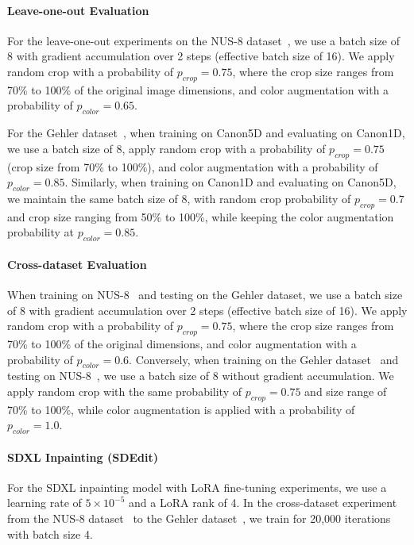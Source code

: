 \paragraph{Leave-one-out Evaluation}
For the leave-one-out experiments on the NUS-8 dataset~\cite{cheng2014illuminant}, we use a batch size of 8 with gradient accumulation over 2 steps (effective batch size of 16). We apply random crop with a probability of $p_{crop} = 0.75$, where the crop size ranges from 70\% to 100\% of the original image dimensions, and color augmentation with a probability of $p_{color} = 0.65$. 

For the Gehler dataset~\cite{4587765}, when training on Canon5D and evaluating on Canon1D, we use a batch size of 8, apply random crop with a probability of $p_{crop} = 0.75$ (crop size from 70\% to 100\%), and color augmentation with a probability of $p_{color} = 0.85$. Similarly, when training on Canon1D and evaluating on Canon5D, we maintain the same batch size of 8, with random crop probability of $p_{crop} = 0.7$ and crop size ranging from 50\% to 100\%, while keeping the color augmentation probability at $p_{color} = 0.85$.

\paragraph{Cross-dataset Evaluation}
When training on NUS-8~\cite{cheng2014illuminant} and testing on the Gehler dataset\cite{4587765}, we use a batch size of 8 with gradient accumulation over 2 steps (effective batch size of 16). We apply random crop with a probability of $p_{crop} = 0.75$, where the crop size ranges from 70\% to 100\% of the original dimensions, and color augmentation with a probability of $p_{color} = 0.6$. Conversely, when training on the Gehler dataset~\cite{4587765} and testing on NUS-8~\cite{cheng2014illuminant}, we use a batch size of 8 without gradient accumulation. We apply random crop with the same probability of $p_{crop} = 0.75$ and size range of 70\% to 100\%, while color augmentation is applied with a probability of $p_{color} = 1.0$.

\paragraph{SDXL Inpainting (SDEdit)}
For the SDXL inpainting model \cite{rombach2021highresolution} with LoRA fine-tuning experiments, we use a learning rate of $5 \times 10^{-5}$ and a LoRA rank of 4. In the cross-dataset experiment from the NUS-8 dataset~\cite{cheng2014illuminant} to the Gehler dataset~\cite{4587765}, we train for 20,000 iterations with batch size 4.

